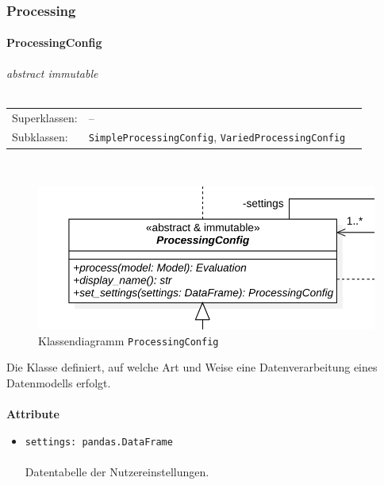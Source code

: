 \documentclass{article}
\newcommand{\classheader}[2][]{\paragraph{#2}
\mbox{}\textit{#1}\\\\}
\begin{document}
\newpage
\subsubsection{Processing}

\classheader[\flqq{}abstract\frqq \mbox{} \flqq{}immutable\frqq]{ProcessingConfig}\label{cls:ProcessingConfig}
\begin{tabular}{lll}
 Superklassen: & --\\
 Subklassen: & \texttt{SimpleProcessingConfig}, \texttt{VariedProcessingConfig}
\end{tabular}\\
\begin{figure}[H]%
    \centering
    \includegraphics[width=13cm]{entwurf/Entwurf_dokument/img/cls/model/ProcessingConfig.png}
    \caption{Klassendiagramm \texttt{ProcessingConfig}}
\end{figure}

Die Klasse definiert, auf welche Art und Weise eine Datenverarbeitung eines Datenmodells erfolgt.
\\\\

\textbf{Attribute}
\begin{itemize}\setlength\itemsep{3em}
\item \texttt{settings: pandas.DataFrame}\\\\
Datentabelle der Nutzereinstellungen.
\\\\
\end{itemize}
\end{document}
